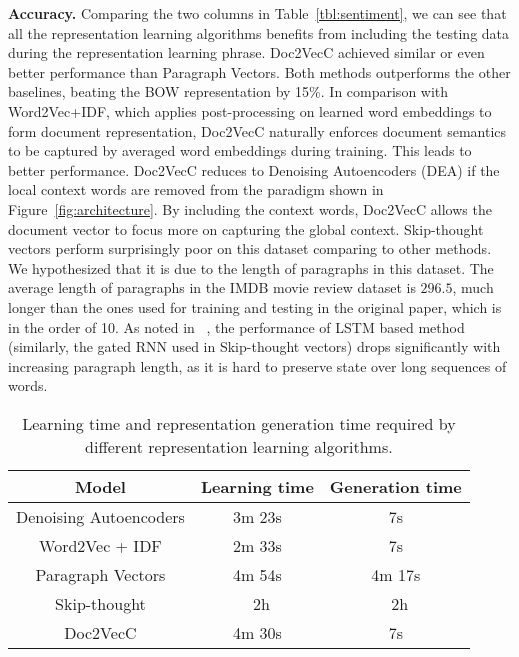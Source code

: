 \documentclass{article} \usepackage{iclr2017_conference,times}
\newcommand{\name}{Doc2VecC}
\begin{document}
\textbf{Accuracy.}
Comparing the two columns in Table~\ref{tbl:sentiment}, we can see that all the representation learning algorithms benefits from including the testing data during the representation learning phrase. \name{} achieved similar or even better performance than Paragraph Vectors. Both methods outperforms the other baselines,  beating the BOW representation by 15\%.  In comparison with Word2Vec+IDF, which applies post-processing on learned word embeddings to form document representation, \name{} naturally enforces document semantics to be captured by averaged word embeddings during training. This leads to better performance. \name{} reduces to Denoising Autoencoders (DEA) if the local context words are removed from the paradigm shown in Figure~\ref{fig:architecture}. By including the context words, \name{} allows the document vector to focus more on capturing the global context. Skip-thought vectors perform surprisingly poor on this dataset comparing to other methods. We hypothesized that it is due to the length of paragraphs in this dataset.  The average length of paragraphs in the IMDB movie review dataset is $296.5$, much longer than the ones used for training and testing in the original paper, which is in the order of 10. As noted in ~\citep{tai2015improved}, the performance of LSTM based method (similarly, the gated RNN used in Skip-thought vectors) drops significantly with increasing paragraph length, as it is hard to preserve state over long sequences of words. 


\begin{table}
\caption{Learning time and representation generation time required by different representation learning algorithms. }
\label{tbl:time}
\centering
\begin{tabular}{|c||c|c|}
\hline
Model & Learning time &  Generation time\\
\hline
\hline
Denoising Autoencoders  & 3m 23s & 7s \\
Word2Vec + IDF  &  2m 33s & 7s\\
Paragraph Vectors  & 4m 54s & 4m 17s\\
Skip-thought & ~2h & ~2h \\
\name &  4m 30s & 7s \\
\hline
\end{tabular}
\label{tbl:sentimenttime}
\end{table}
\end{document}
